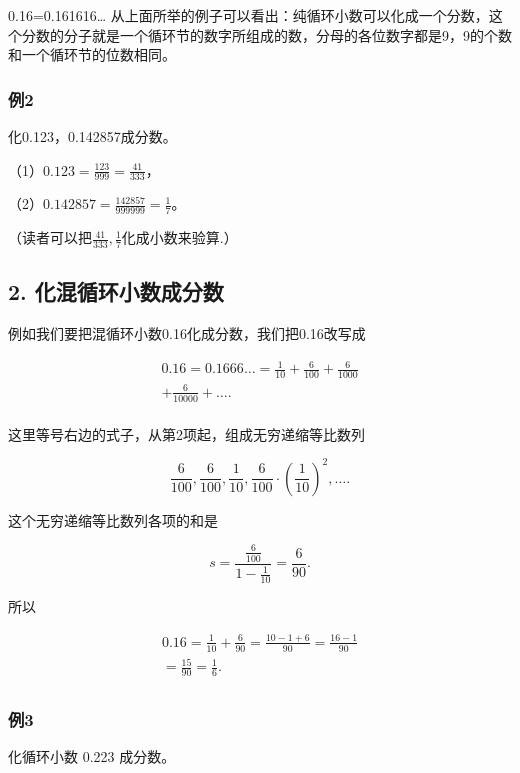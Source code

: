  0.16=0.161616\ldots{}
从上面所举的例子可以看出：纯循环小数可以化成一个分数，这个分数的分子就是一个循环节的数字所组成的数，分母的各位数字都是9，9的个数和一个循环节的位数相同。

\subsubsection{例2}

化0.123，0.142857成分数。

 （1）\(0.123 = \frac{123}{999} = \frac{41}{333}\)，

（2）\(0.142857 = \frac{142857}{999999} = \frac{1}{7}\)。

（读者可以把\(\frac{41}{333}, \frac{1}{7}\)化成小数来验算.）

\subsection{2. 化混循环小数成分数}

例如我们要把混循环小数0.16化成分数，我们把0.16改写成

\[
\begin{array}{l} 0.16 = 0.1666 \dots = \frac{1}{10} + \frac{6}{100} + \frac{6}{1000} \\ + \frac{6}{10000} + \dots. \\ \end{array}
\]

这里等号右边的式子，从第2项起，组成无穷递缩等比数列

\[
\frac{6}{100}, \frac{6}{100}, \frac{1}{10}, \frac{6}{100} \cdot \left(\frac{1}{10}\right)^{2}, \dots.
\]

这个无穷递缩等比数列各项的和是

\[
s = \frac{\frac{6}{100}}{1 - \frac{1}{10}} = \frac{6}{90}.
\]

所以

\[
\begin{array}{l} 0.16 = \frac{1}{10} + \frac{6}{90} = \frac{10 - 1 + 6}{90} = \frac{16 - 1}{90} \\ = \frac{15}{90} = \frac{1}{6}. \\ \end{array}
\]

\subsubsection{例3}

化循环小数 0.223 成分数。

